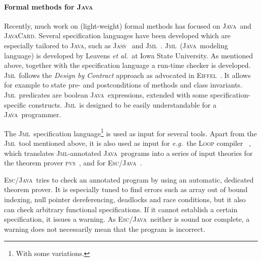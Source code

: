 \documentclass[a4paper]{llncs}
\newcommand{\jml}{\textsc{Jml}}
\newcommand{\escj}{\textsc{Esc/Java}}
\newcommand{\eiffel}{\textsc{Eiffel}}
\newcommand{\jass}{\textsc{Jass}}
\newcommand{\java}{\textsc{Java}}
\newcommand{\cPP}{\texttt{C/C}\nolinebreak\hspace{-.05em}\raisebox{.4ex}{\tiny\bf
+}\nolinebreak\hspace{-.10em}\raisebox{.4ex}{\tiny\bf +}}
\begin{document}
\paragraph{\bf{Formal methods for \java}}
Recently, much work on (light-weight) formal methods has focused on
\java\ and \textsc{JavaCard}. Several specification languages have
been developed which are especially tailored to \java, such as
\jass~\cite{bartetzko01assertions} and \jml~\cite{LeavensBR00}.
\jml\ (\java\ modeling language) is developed by Leavens \emph{et 
al.}~at Iowa State University. As mentioned above, together with the
specification language a run-time checker is developed. \jml\ follows
the \emph{Design by Contract} approach as advocated in
\eiffel~\cite{Meyer97}. It allows for example to state pre- and
postconditions of methods and class invariants. \jml\ predicates are
boolean \java\ expressions, extended with some specification-specific
constructs. \jml\ is designed to be easily understandable for a \java\
programmer.

The \jml\ specification language\footnote{With some variations.} is
used as input for several tools. Apart from the \jml\ tool mentioned
above, it is also used as input for \emph{e.g.}~the
\textsc{Loop} compiler~\cite{LoopURL,BergJ01} , which translates
\jml-annotated \java\ programs into a series of input theories for the 
theorem prover \textsc{pvs}~\cite{OwreRRSS96}, and for
\escj~\cite{ESCJavaUrl,EscJmlDiff}. 

\escj\ tries to check an annotated program by
using an automatic, dedicated theorem prover. It is especially tuned
to find errors such as array out of bound indexing, null pointer
dereferencing, deadlocks and race conditions, but it also can check
arbitrary functional specifications. If it cannot establish a certain
specification, it issues a warning. As \escj\ neither is sound nor
complete, a warning does not necessarily mean that the program is
incorrect.

\end{document}

